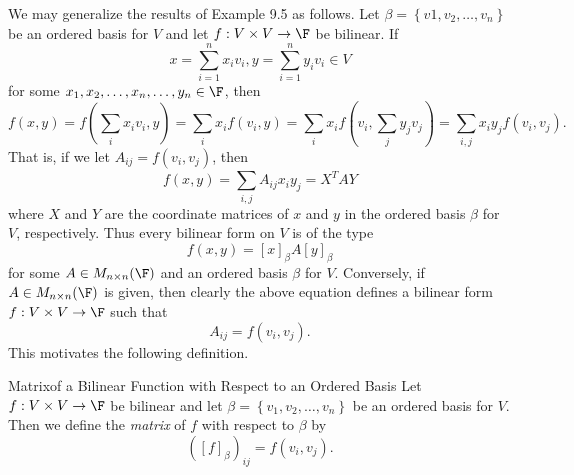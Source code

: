 \documentclass[linearalgebra]{subfiles}
\begin{document}
    \begin{remark}
        We may generalize the results of Example 9.5 as follows. Let $\beta = \left\lbrace v1,v_2,\ldots,v_n \right\rbrace $ be an ordered basis for $V$ and let $f:V\times V\to\F$ be bilinear. If
        \begin{equation*}
            x = \sum^{n}_{i=1} x_iv_i, y = \sum^{n}_{i=1} y_iv_i\in V
        \end{equation*}
        for some $x_1,x_2,\ldots,x_n, \ldots, y_n\in\F$, then
        \begin{equation*}
            f(x,y) = f\left( \sum^{}_{i} x_iv_i,y \right) = \sum^{}_{i} x_if\left( v_i,y \right) = \sum^{}_{i} x_if\left( v_i, \sum^{}_{j} y_jv_j \right) = \sum^{}_{i,j} x_iy_jf\left( v_i,v_j \right) . 
        \end{equation*}
        That is, if we let $A_{ij} = f\left( v_i,v_j \right)$, then
        \begin{equation*}
            f\left( x,y \right) = \sum^{}_{i,j} A_{ij}x_iy_j = X^TAY
        \end{equation*}
        where $X$ and $Y$ are the coordinate matrices of $x$ and $y$ in the ordered basis $\beta$ for $V$, respectively. Thus every bilinear form on $V$ is of the type
        \begin{equation*}
            f\left( x,y \right) = \left[ x \right] _\beta A\left[ y \right] _\beta
        \end{equation*}
        for some $A\in M_{n\times n}(\F)$ and an ordered basis $\beta$ for $V$. Conversely, if $A\in M_{n\times n}(\F)$ is given, then clearly the above equation defines a bilinear form $f:V\times V\to\F$ such that
        \begin{equation*}
            A_{ij} = f\left( v_i,v_j \right) .
        \end{equation*}
        This motivates the following definition.
    \end{remark}

    \begin{definition}{Matrix}{of a Bilinear Function with Respect to an Ordered Basis}
        Let $f:V\times V\to\F$ be bilinear and let $\beta = \left\lbrace v_1,v_2,\ldots,v_n \right\rbrace$ be an ordered basis for $V$. Then we define the \emph{matrix} of $f$ with respect to $\beta$ by
        \begin{equation*}
            \left( \left[ f \right] _\beta \right) _{ij} = f\left( v_i,v_j \right) .
        \end{equation*}
    \end{definition}
    
\end{document}

